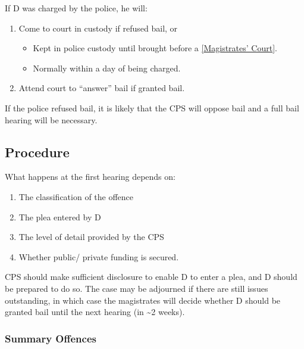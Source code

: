 \documentclass[
]{article}
\providecommand{\tightlist}{%
  \setlength{\itemsep}{0pt}\setlength{\parskip}{0pt}}
\begin{document}
If D was charged by the police, he will:

\begin{enumerate}
\def\labelenumi{\arabic{enumi}.}
\tightlist
\item
  Come to court in custody if refused bail, or

  \begin{itemize}
  \tightlist
  \item
    Kept in police custody until brought before a
    \href{maximum\%20compensation\%20of\%20£5,000\%20per\%20offence}{{[}Magistrates'
    Court{]}}.
  \item
    Normally within a day of being charged.
  \end{itemize}
\item
  Attend court to ``answer'' bail if granted bail.
\end{enumerate}

If the police refused bail, it is likely that the CPS will oppose bail
and a full bail hearing will be necessary.

\hypertarget{procedure}{%
\subsection{Procedure}\label{procedure}}

What happens at the first hearing depends on:

\begin{enumerate}
\def\labelenumi{\arabic{enumi}.}
\tightlist
\item
  The classification of the offence
\item
  The plea entered by D
\item
  The level of detail provided by the CPS
\item
  Whether public/ private funding is secured.
\end{enumerate}

CPS should make sufficient disclosure to enable D to enter a plea, and D
should be prepared to do so. The case may be adjourned if there are
still issues outstanding, in which case the magistrates will decide
whether D should be granted bail until the next hearing (in
\textasciitilde2 weeks).

\hypertarget{summary-offences}{%
\subsubsection{Summary Offences}\label{summary-offences}}
\end{document}
